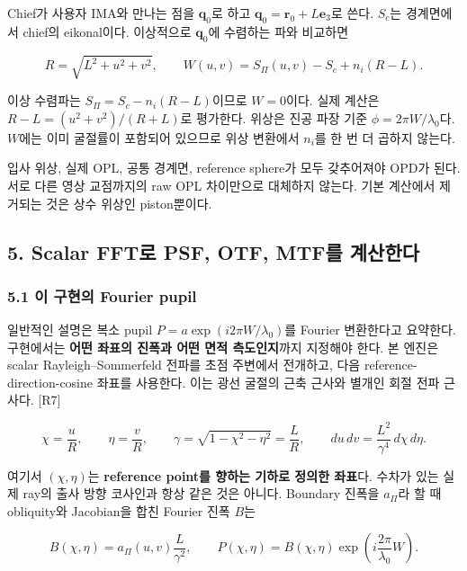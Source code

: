 \documentclass[
  a4paper,
]{article}
\begin{document}
Chief가 사용자 IMA와 만나는 점을 \(\mathbf q_0\)로 하고
\(\mathbf q_0=\mathbf r_0+L\mathbf e_3\)로 쓴다. \(S_c\)는 경계면에서
chief의 eikonal이다. 이상적으로 \(\mathbf q_0\)에 수렴하는 파와 비교하면

\[
R=\sqrt{L^2+u^2+v^2},\qquad
W(u,v)=S_\Pi(u,v)-S_c+n_i(R-L).
\tag{19}
\]

이상 수렴파는 \(S_\Pi=S_c-n_i(R-L)\)이므로 \(W=0\)이다. 실제 계산은
\(R-L=(u^2+v^2)/(R+L)\)로 평가한다. 위상은 진공 파장 기준
\(\phi=2\pi W/\lambda_0\)다. \(W\)에는 이미 굴절률이 포함되어 있으므로
위상 변환에서 \(n_i\)를 한 번 더 곱하지 않는다.

입사 위상, 실제 OPL, 공통 경계면, reference sphere가 모두 갖추어져야
OPD가 된다. 서로 다른 영상 교점까지의 raw OPL 차이만으로 대체하지
않는다. 기본 계산에서 제거되는 것은 상수 위상인 piston뿐이다.

\hypertarget{scalar-fftuxb85c-psf-otf-mtfuxb97c-uxacc4uxc0b0uxd55cuxb2e4}{%
\subsection{5. Scalar FFT로 PSF, OTF, MTF를
계산한다}\label{scalar-fftuxb85c-psf-otf-mtfuxb97c-uxacc4uxc0b0uxd55cuxb2e4}}

\hypertarget{uxc774-uxad6cuxd604uxc758-fourier-pupil}{%
\subsubsection{5.1 이 구현의 Fourier
pupil}\label{uxc774-uxad6cuxd604uxc758-fourier-pupil}}

일반적인 설명은 복소 pupil \(P=a\exp(i2\pi W/\lambda_0)\)를 Fourier
변환한다고 요약한다. 구현에서는 \textbf{어떤 좌표의 진폭과 어떤 면적
측도인지}까지 지정해야 한다. 본 엔진은 scalar Rayleigh--Sommerfeld
전파를 초점 주변에서 전개하고, 다음 reference-direction-cosine 좌표를
사용한다. 이는 광선 굴절의 근축 근사와 별개인 회절 전파 근사다. {[}R7{]}

\[
\chi=\frac{u}{R},\qquad\eta=\frac{v}{R},\qquad
\gamma=\sqrt{1-\chi^2-\eta^2}=\frac{L}{R},\qquad
du\,dv=\frac{L^2}{\gamma^4}\,d\chi\,d\eta.
\tag{20}
\]

여기서 \((\chi,\eta)\)는 \textbf{reference point를 향하는 기하로 정의한
좌표}다. 수차가 있는 실제 ray의 출사 방향 코사인과 항상 같은 것은
아니다. Boundary 진폭을 \(a_\Pi\)라 할 때 obliquity와 Jacobian을 합친
Fourier 진폭 \(B\)는

\[
B(\chi,\eta)=a_\Pi(u,v)\frac{L}{\gamma^2},\qquad
P(\chi,\eta)=B(\chi,\eta)
 \exp\left(i\frac{2\pi}{\lambda_0}W\right).
\tag{21}
\]
\end{document}
